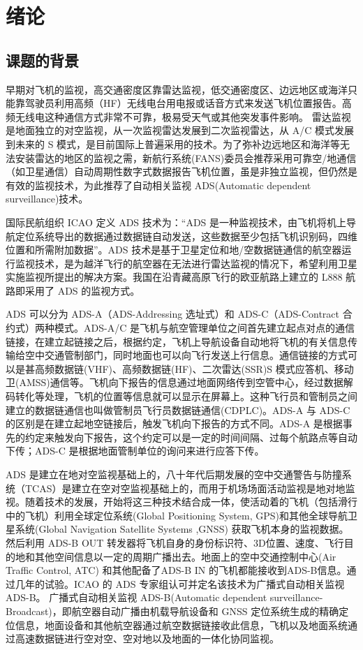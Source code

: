 
\chapter{绪论}
\section{课题的背景}
早期对飞机的监视，高交通密度区靠雷达监视，低交通密度区、边远地区或海洋只能靠驾驶员利用高频（HF）无线电台用电报或话音方式来发送飞机位置报告。高频无线电这种通信方式非常不可靠，极易受天气或其他突发事件影响。 雷达监视是地面独立的对空监视，从一次监视雷达发展到二次监视雷达，从 A/C 模式发展到未来的 S 模式，是目前国际上普遍采用的技术。为了弥补边远地区和海洋等无法安装雷达的地区的监视之需，新航行系统(FANS)委员会推荐采用可靠空/地通信（如卫星通信）自动周期性数字式数据报告飞机位置，虽是非独立监视，但仍然是有效的监视技术，为此推荐了自动相关监视 ADS(Automatic dependent surveillance)技术\cite{zhang2013adsb}。 

国际民航组织 ICAO 定义 ADS 技术为：“ADS 是一种监视技术，由飞机将机上导航定位系统导出的数据通过数据链自动发送，这些数据至少包括飞机识别码，四维位置和所需附加数据”。ADS 技术是基于卫星定位和地/空数据链通信的航空器运行监视技术，是为越洋飞行的航空器在无法进行雷达监视的情况下，希望利用卫星实施监视所提出的解决方案。我国在沿青藏高原飞行的欧亚航路上建立的 L888 航路即采用了 ADS 的监视方式\cite{mccallie2011security}。 

ADS 可以分为 ADS-A（ADS-Addressing 选址式）和 ADS-C（ADS-Contract 合约式）两种模式。ADS-A/C 是飞机与航空管理单位之间首先建立起点对点的通信链接，在建立起链接之后，根据约定，飞机上导航设备自动地将飞机的有关信息传输给空中交通管制部门，同时地面也可以向飞行发送上行信息。通信链接的方式可以是甚高频数据链(VHF)、高频数据链(HF)、二次雷达(SSR)S 模式应答机、移动卫(AMSS)通信等。飞机向下报告的信息通过地面网络传到空管中心，经过数据解码转化等处理，飞机的位置等信息就可以显示在屏幕上。这种飞行员和管制员之间建立的数据链通信也叫做管制员飞行员数据链通信(CDPLC)。ADS-A 与 ADS-C 的区别是在建立起地空链接后，触发飞机向下报告的方式不同。ADS-A 是根据事先的约定来触发向下报告，这个约定可以是一定的时间间隔、过每个航路点等自动下传；ADS-C 是根据地面管制单位的询问来进行应答下传\cite{huang2008guang}。 

ADS 是建立在地对空监视基础上的，八十年代后期发展的空中交通警告与防撞系统（TCAS）是建立在空对空监视基础上的，而用于机场场面活动监视是地对地监视。随着技术的发展，开始将这三种技术结合成一体，使活动着的飞机（包括滑行中的飞机）利用全球定位系统(Global Positioning System, GPS)和其他全球导航卫星系统(Global Navigation Satellite Systems ,GNSS) 获取飞机本身的监视数据。然后利用 ADS-B OUT 转发器将飞机自身的身份标识符、3D位置、速度、飞行目的地和其他空间信息以一定的周期广播出去。地面上的空中交通控制中心(Air Traffic Control, ATC) 和其他配备了ADS-B IN 的飞机都能接收到ADS-B信息。通过几年的试验。ICAO 的 ADS 专家组认可并定名该技术为广播式自动相关监视 ADS-B。 广播式自动相关监视 ADS-B(Automatic dependent surveillance-Broadcast)，即航空器自动广播由机载导航设备和 GNSS 定位系统生成的精确定位信息，地面设备和其他航空器通过航空数据链接收此信息，飞机以及地面系统通过高速数据链进行空对空、空对地以及地面的一体化协同监视。 

